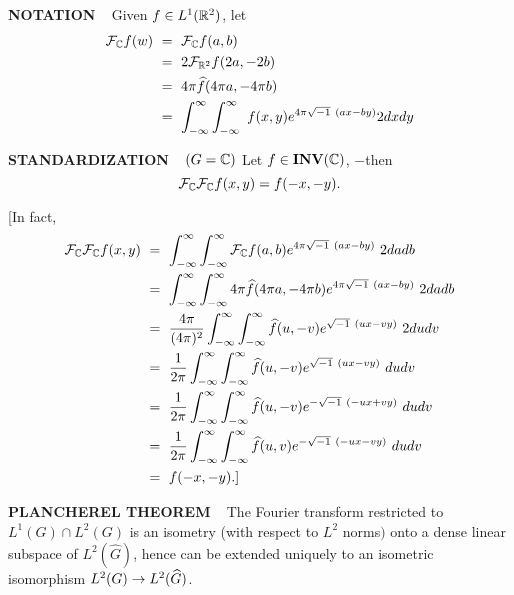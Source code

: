 \begin{x}{\small\bf NOTATION} \ %
Given $f \in L^1(\mathbb{R}^2)$, let
\begin{align*}
\sF_\C f(w) \ 
&= \  \sF_\C f(a,b)\\
&= \  2 \sF_{\R^2} f(2a,-2b)\\
&= \  4 \pi \widehat{f} (4 \pi a, -4\pi b)\\
&= \  \int_{-\infty}^\infty  \int_{-\infty}^\infty \ f(x,y)e^{4 \pi \sqrt{-1}\  (ax - by)} 2dxdy\\
\end{align*}
\end{x}

\begin{x}{\small\bf STANDARDIZATION} \ %
$(G = \mathbb{C})$ Let $f \in \mathbf{INV}(\mathbb{C})$, $-$then
\[
\mathcal{F}_{\mathbb{C}} \mathcal{F}_{\mathbb{C}} f(x,y) = f(-x, -y).
\]

[In fact,
\begin{align*}
\sF_\C \sF_\C f(x,y) \ 
&= \  \int_{-\infty}^\infty \int_{-\infty}^\infty \sF_\C f(a,b) e^{4 \pi \sqrt{-1} \ (ax - by)} \ 2dadb \\	
&= \  \int_{-\infty}^\infty \int_{-\infty}^\infty 4\pi \widehat{f}(4\pi a, -4\pi b) e^{4\pi\sqrt{-1}\  (ax - by)}\  2dadb \\	
&= \  \frac{4\pi}{(4\pi)^2} \int_{-\infty}^\infty \int_{-\infty}^\infty  \widehat{f}(u,-v) e^{\sqrt{-1}\  (ux - vy)}\  2dudv\\	
&= \  \frac{1}{2\pi}  \int_{-\infty}^\infty \int_{-\infty}^\infty  \widehat{f}(u,-v) e^{\sqrt{-1}\  (ux - vy)}\  dudv\\	
&= \  \frac{1}{2\pi}  \int_{-\infty}^\infty \int_{-\infty}^\infty  \widehat{f}(u,-v) e^{-\sqrt{-1}\  (-ux + vy)}\  dudv\\
&= \  \frac{1}{2\pi}  \int_{-\infty}^\infty \int_{-\infty}^\infty  \widehat{f}(u,v) e^{-\sqrt{-1}\  (-ux - vy)}\  dudv\\
&= \  f(-x, -y).]
\end{align*}
\end{x}

\vspace{0.1cm}


\begin{x}{\small\bf PLANCHEREL THEOREM} \ %
The Fourier transform restricted to $L^1(G) \cap L^2(G)$ is an isometry 
(with respect to $L^2$ norms$)$ onto a dense linear subspace of $L^2(\widehat{G})$, 
hence can be extended uniquely to an isometric isomorphism $L^2(G) \rightarrow L^2(\widehat{G})$.\\
\end{x}

